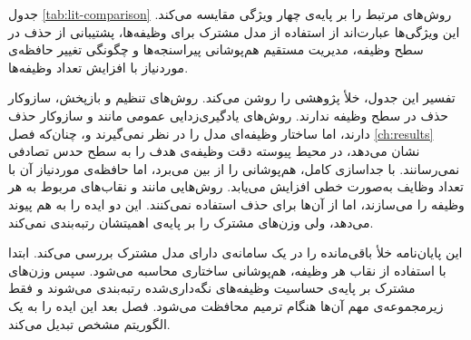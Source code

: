جدول \ref{tab:lit-comparison} روش‌های مرتبط را بر پایه‌ی چهار ویژگی مقایسه می‌کند. این ویژگی‌ها عبارت‌اند از استفاده از مدل مشترک برای وظیفه‌ها، پشتیبانی از حذف در سطح وظیفه، مدیریت مستقیم هم‌پوشانی پیراسنجه‌ها و چگونگی تغییر حافظه‌ی موردنیاز با افزایش تعداد وظیفه‌ها.



تفسیر این جدول، خلأ پژوهشی را روشن می‌کند. روش‌های تنظیم و بازپخش، سازوکار حذف در سطح وظیفه ندارند. روش‌های یادگیری‌زدایی عمومی مانند  و  سازوکار حذف دارند، اما ساختار وظیفه‌ای مدل را در نظر نمی‌گیرند و، چنان‌که فصل \ref{ch:results} نشان می‌دهد، در محیط پیوسته دقت وظیفه‌ی هدف را به سطح حدس تصادفی نمی‌رسانند.  با جداسازی کامل، هم‌پوشانی را از بین می‌برد، اما حافظه‌ی موردنیاز آن با تعداد وظایف به‌صورت خطی افزایش می‌یابد. روش‌هایی مانند  و  نقاب‌های مربوط به هر وظیفه را می‌سازند، اما از آن‌ها برای حذف استفاده نمی‌کنند.  این دو ایده را به هم پیوند می‌دهد، ولی وزن‌های مشترک را بر پایه‌ی اهمیتشان رتبه‌بندی نمی‌کند.

این پایان‌نامه خلأ باقی‌مانده را در یک سامانه‌ی دارای مدل مشترک بررسی می‌کند. ابتدا با استفاده از نقاب هر وظیفه، هم‌پوشانی ساختاری محاسبه می‌شود. سپس وزن‌های مشترک بر پایه‌ی حساسیت وظیفه‌های نگه‌داری‌شده رتبه‌بندی می‌شوند و فقط زیرمجموعه‌ی مهم آن‌ها هنگام ترمیم محافظت می‌شود. فصل بعد این ایده را به یک الگوریتم مشخص تبدیل می‌کند.
